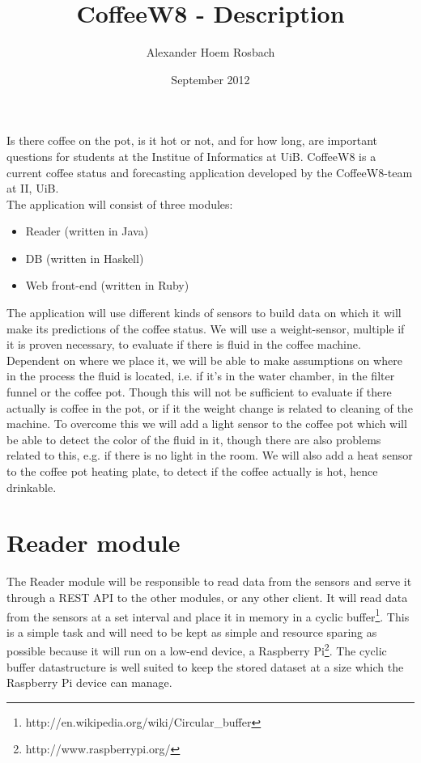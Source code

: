 \documentclass[a4paper]{article}
\begin{document}
\title{CoffeeW8 - Description}
\author{Alexander Hoem Rosbach}
\date{September 2012}
\maketitle

Is there coffee on the pot, is it hot or not, and for how long, are important questions for students at the Institue of Informatics at UiB. 
CoffeeW8 is a current coffee status and forecasting application developed by the CoffeeW8-team at II, UiB. \\

The application will consist of three modules: 
\begin{itemize}
\item Reader (written in Java)
\item DB (written in Haskell)
\item Web front-end (written in Ruby)
\end{itemize}

The application will use different kinds of sensors to build data on which it will make its predictions of the coffee status. We will use a weight-sensor,
multiple if it is proven necessary, to evaluate if there is fluid in the coffee machine. Dependent on where we place it, we will be able to make assumptions on
where in the process the fluid is located, i.e. if it's in the water chamber, in the filter funnel or the coffee pot. Though this will not be sufficient to evaluate
if there actually is coffee in the pot, or if it the weight change is related to cleaning of the machine. To overcome this we will add a light sensor to the coffee 
pot which will be able to detect the color of the fluid in it, though there are also problems related to this, e.g. if there is no light in the room. We will also
add a heat sensor to the coffee pot heating plate, to detect if the coffee actually is hot, hence drinkable. \\

\section{Reader module}
The Reader module will be responsible to read data from the sensors and serve it through a REST API to the other modules, or any other client. It will read data from
the sensors at a set interval and place it in memory in a cyclic buffer\footnote{http://en.wikipedia.org/wiki/Circular\_buffer}. This is a simple task and will need 
to be kept as simple and resource sparing as possible because it will run on a low-end device, a Raspberry Pi\footnote{http://www.raspberrypi.org/}. The cyclic buffer 
datastructure is well suited to keep the stored dataset at a size which the Raspberry Pi device can manage. \\
\end{document}
